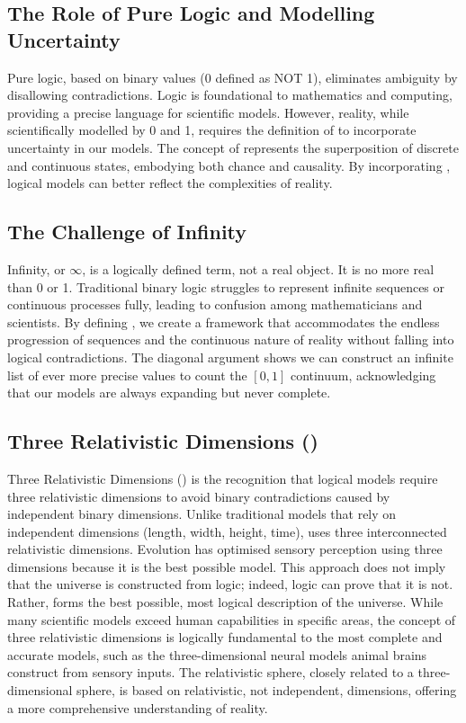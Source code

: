 \documentclass{article}
\begin{document}
\subsection*{The Role of Pure Logic and Modelling Uncertainty}

Pure logic, based on binary values (0 defined as NOT 1), eliminates ambiguity by disallowing contradictions. Logic is foundational to mathematics and computing, providing a precise language for scientific models. However, reality, while scientifically modelled by 0 and 1, requires the definition of \qbit{} to incorporate uncertainty in our models. The concept of \qbit{} represents the superposition of discrete and continuous states, embodying both chance and causality. By incorporating \qbit{}, logical models can better reflect the complexities of reality.

\subsection*{The Challenge of Infinity}

Infinity, or \(\infty\), is a logically defined term, not a real object. It is no more real than 0 or 1. Traditional binary logic struggles to represent infinite sequences or continuous processes fully, leading to confusion among mathematicians and scientists. By defining \qbit{}, we create a framework that accommodates the endless progression of sequences and the continuous nature of reality without falling into logical contradictions. The diagonal argument shows we can construct an infinite list of ever more precise values to count the \([0,1]\) continuum, acknowledging that our models are always expanding but never complete.

\subsection*{Three Relativistic Dimensions (\iR{})}

Three Relativistic Dimensions (\iR{}) is the recognition that logical models require three relativistic dimensions to avoid binary contradictions caused by independent binary dimensions. Unlike traditional models that rely on independent dimensions (length, width, height, time), \iR{} uses three interconnected relativistic dimensions. Evolution has optimised sensory perception using three dimensions because it is the best possible model. This approach does not imply that the universe is constructed from logic; indeed, logic can prove that it is not. Rather, \iR{} forms the best possible, most logical description of the universe. While many scientific models exceed human capabilities in specific areas, the concept of three relativistic dimensions is logically fundamental to the most complete and accurate models, such as the three-dimensional neural models animal brains construct from sensory inputs. The relativistic sphere, closely related to a three-dimensional sphere, is based on relativistic, not independent, dimensions, offering a more comprehensive understanding of reality.
\end{document}
